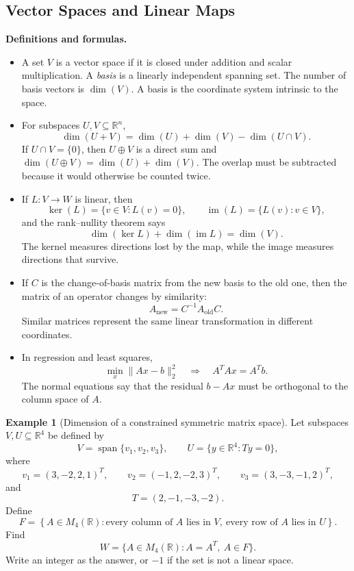 \documentclass[11pt]{article}
\theoremstyle{definition}
\newtheorem{example}{Example}[section]
\newcommand{\R}{\mathbb{R}}
\newcommand{\Span}{\operatorname{span}}
\begin{document}
\subsection{Vector Spaces and Linear Maps}
\textbf{Definitions and formulas.}
\begin{itemize}
    \item A set $V$ is a vector space if it is closed under addition and scalar multiplication. A \emph{basis} is a linearly independent spanning set. The number of basis vectors is $\dim(V)$. A basis is the coordinate system intrinsic to the space.
    \item For subspaces $U,V\subseteq \R^n$,
    \[
        \dim(U+V)=\dim(U)+\dim(V)-\dim(U\cap V).
    \]
    If $U\cap V=\{0\}$, then $U\oplus V$ is a direct sum and $\dim(U\oplus V)=\dim(U)+\dim(V)$. The overlap must be subtracted because it would otherwise be counted twice.
    \item If $L:V\to W$ is linear, then
    \[
        \ker(L)=\{v\in V:L(v)=0\}, \qquad \operatorname{im}(L)=\{L(v):v\in V\},
    \]
    and the rank--nullity theorem says
    \[
        \dim(\ker L)+\dim(\operatorname{im}L)=\dim(V).
    \]
    The kernel measures directions lost by the map, while the image measures directions that survive.
    \item If $C$ is the change-of-basis matrix from the new basis to the old one, then the matrix of an operator changes by similarity:
    \[
        A_{\text{new}}=C^{-1}A_{\text{old}}C.
    \]
    Similar matrices represent the same linear transformation in different coordinates.
    \item In regression and least squares,
    \[
        \min_x \|Ax-b\|_2^2
        \quad \Longrightarrow \quad
        A^TAx=A^Tb.
    \]
    The normal equations say that the residual $b-Ax$ must be orthogonal to the column space of $A$.
\end{itemize}

\begin{example}[Dimension of a constrained symmetric matrix space]
Let subspaces $V,U\subseteq \R^4$ be defined by
\[
V=\Span\{v_1,v_2,v_3\}, \qquad U=\{y\in\R^4:Ty=0\},
\]
where
\[
v_1=(3,-2,2,1)^T,\qquad
v_2=(-1,2,-2,3)^T,\qquad
v_3=(3,-3,-1,2)^T,
\]
and
\[
T=(2,-1,-3,-2).
\]
Define
\[
F=\left\{A\in M_4(\R): \text{every column of }A\text{ lies in }V,\ \text{every row of }A\text{ lies in }U\right\}.
\]
Find
\[
W=\{A\in M_4(\R): A=A^T,\ A\in F\}.
\]
Write an integer as the answer, or $-1$ if the set is not a linear space.
\end{example}
\end{document}
